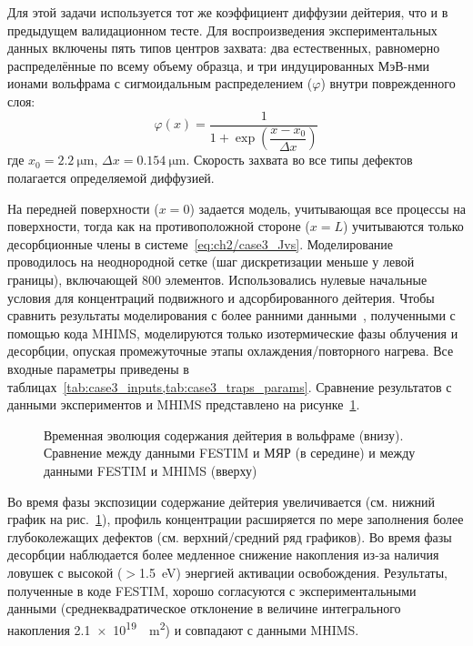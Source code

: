 Для этой задачи используется тот же коэффициент диффузии дейтерия, что и в предыдущем валидационном тесте. Для воспроизведения экспериментальных данных включены пять типов центров захвата: два естественных, равномерно распределённые по всему объему образца, и три индуцированных МэВ-нми ионами вольфрама с сигмоидальным распределением ($\varphi$) внутри поврежденного слоя:
\begin{equation}
    \varphi(x)=\frac{1}{1+\exp\left( \dfrac{x-x_0}{\Delta x} \right)}
\end{equation}
где $x_0=\SI{2.2}{\micro\meter}$, $\Delta x=\SI{0.154}{\micro\meter}$. Скорость захвата во все типы дефектов полагается определяемой диффузией.

На передней поверхности ($x=0$) задается модель, учитывающая все процессы на поверхности, тогда как на противоположной стороне ($x=L$) учитываются только десорбционные члены в системе~\eqref{eq:ch2/case3_Jvs}. Моделирование проводилось на неоднородной сетке (шаг дискретизации меньше у левой границы), включающей 800 элементов. Использовались нулевые начальные условия для концентраций подвижного и адсорбированного дейтерия. Чтобы сравнить результаты моделирования с более ранними данными~\cite{Hodille2017}, полученными с помощью кода MHIMS, моделируются только изотермические фазы облучения и десорбции, опуская промежуточные этапы охлаждения/повторного нагрева. Все входные параметры приведены в таблицах~\cref{tab:case3_inputs,tab:case3_traps_params}. Сравнение результатов с данными экспериментов и MHIMS представлено на рисунке~\cref{fig:ch2/val3}.

\begin{figure}[ht]
    \caption{Временная эволюция содержания дейтерия в вольфраме (внизу). Сравнение между данными FESTIM и МЯР (в середине) и между данными FESTIM и MHIMS (вверху)}\label{fig:ch2/val3}
\end{figure}

Во время фазы экспозиции содержание дейтерия увеличивается (см. нижний график на рис.~\ref{fig:ch2/val3}), профиль концентрации расширяется по мере заполнения более глубоколежащих дефектов (см. верхний/средний ряд графиков). Во время фазы десорбции наблюдается более медленное снижение накопления из-за наличия ловушек с высокой ($>$\SI{1.5}{\electronvolt}) энергией активации освобождения. Результаты, полученные в коде FESTIM, хорошо согласуются с экспериментальными данными (среднеквадратическое отклонение в величине интегрального накопления \SI{2.1e19}{\per\meter\squared}) и совпадают с данными MHIMS.

